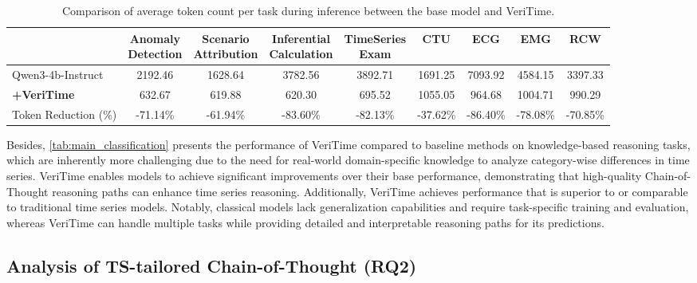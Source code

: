 \documentclass{article}
\theoremstyle{plain}
\theoremstyle{definition}
\theoremstyle{remark}
\begin{document}
\begin{table}[htbp]
    \scriptsize
    \centering
    \caption{Comparison of average token count per task during inference between the base model and VeriTime.}
    \vspace{-0.75em}
    \label{tab:output_token}
    \setlength{\tabcolsep}{3pt}
    \begin{tabular}{lcccccccc}
        \toprule
        & \makecell{Anomaly \\ Detection} & \makecell{Scenario \\ Attribution} & \makecell{Inferential \\ Calculation} & \makecell{TimeSeries \\ Exam} & CTU & ECG & EMG & RCW \\
        \midrule
        Qwen3-4b-Instruct    & 2192.46 & 1628.64 & 3782.56 & 3892.71 & 1691.25 & 7093.92 & 4584.15 & 3397.33 \\
        \textbf{+VeriTime} & 632.67  & 619.88  & 620.30  & 695.52  & 1055.05 & 964.68  & 1004.71 & 990.29  \\
        \rowcolor{cyan!10} Token Reduction (\%) & -71.14\% & -61.94\% & -83.60\% & -82.13\% & -37.62\% & -86.40\% & -78.08\% & -70.85\% \\
        \bottomrule
    \end{tabular}
    \vspace{-2.5em}
\end{table}

Besides, \autoref{tab:main_classification} presents the performance of VeriTime compared to baseline methods on knowledge-based reasoning tasks, which are inherently more challenging due to the need for real-world domain-specific knowledge to analyze category-wise differences in time series. VeriTime enables models to achieve significant improvements over their base performance, demonstrating that high-quality Chain-of-Thought reasoning paths can enhance time series reasoning. Additionally, VeriTime achieves performance that is superior to or comparable to traditional time series models. Notably, classical models lack generalization capabilities and require task-specific training and evaluation, whereas VeriTime can handle multiple tasks while providing detailed and interpretable reasoning paths for its predictions.


\subsection{Analysis of TS-tailored Chain-of-Thought (RQ2)}
\end{document}
